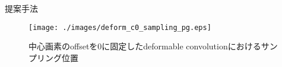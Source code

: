 \begin{chapter}{提案手法}

\begin{figure}[H]
  \centering
  \texttt{[image: ./images/deform\_c0\_sampling\_pg.eps]}
  \caption{中心画素のoffsetを0に固定したdeformable convolutionにおけるサンプリング位置}
  \label{fig:defconv_c0_sampling_pg}
\end{figure}

\end{chapter}
